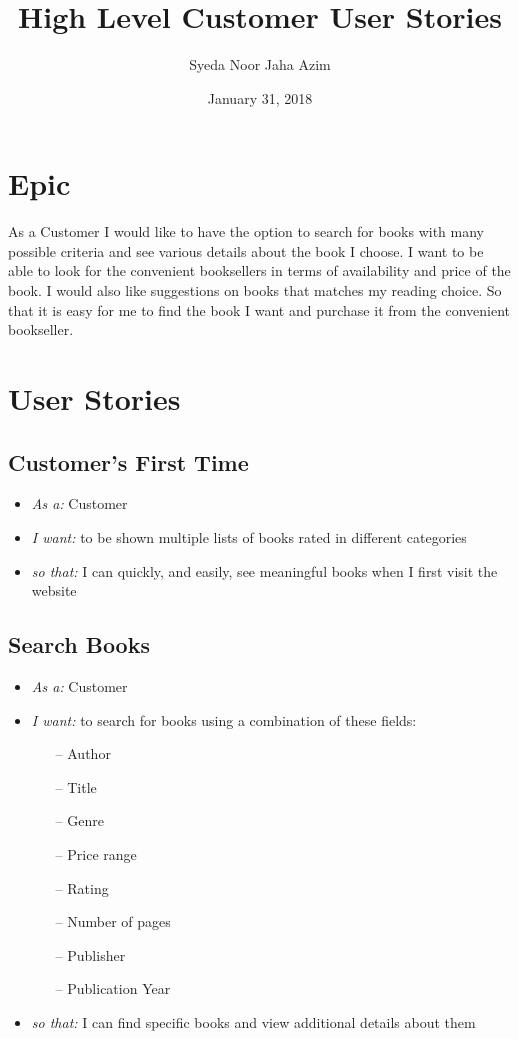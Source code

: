 \documentclass{article}
\title{High Level Customer User Stories}
\author{Syeda Noor Jaha Azim}
\date{January 31, 2018}
\begin{document}
\maketitle

\section{Epic }
As a Customer I would like to have the option to search for books with many possible criteria and see various details about the book I choose. I want to be able to look for the convenient booksellers in terms of availability and price of the book. I would also like suggestions on books that matches my reading choice. So that it is easy for me to find the book I want and purchase it from the convenient bookseller. 

\section{User Stories }

\subsection{Customer's First Time }
\begin{itemize}
\item \emph{As a:} Customer
\item \emph{I want:} to be shown multiple lists of books rated in different categories
\item \emph{so that:} I can quickly, and easily, see meaningful books when I first visit the website
\end{itemize}

\subsection{Search Books}
\begin{itemize}
\item \emph{As a:} Customer
\item \emph{I want:} to search for books using a combination of these fields:
\begin{itemize}
    \item[--] Author
    \item[--] Title
    \item[--] Genre
    \item[--] Price range
    \item[--] Rating
    \item[--] Number of pages
    \item[--] Publisher
    \item[--] Publication Year
\end{itemize}
\item \emph{so that:} I can find specific books and view additional details about them
\end{itemize}
\end{document}
